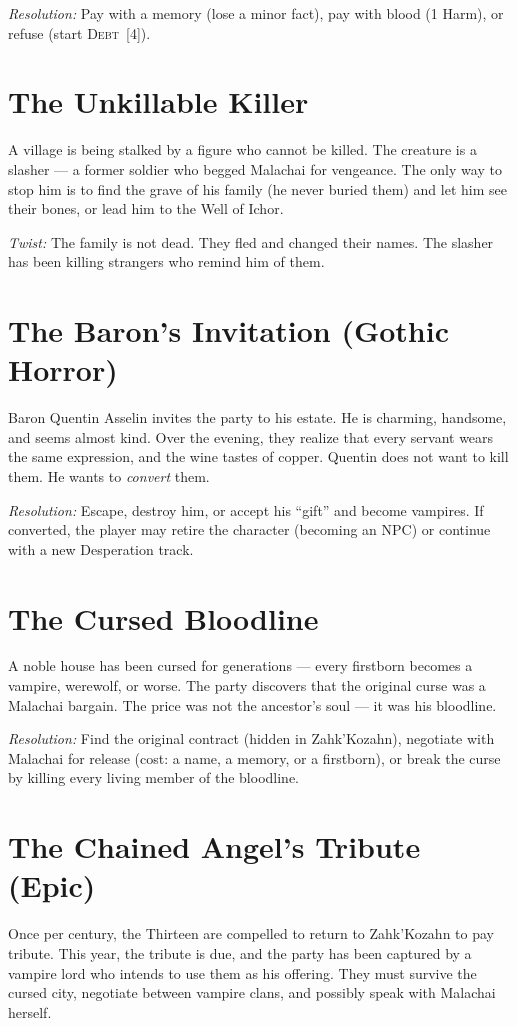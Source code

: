 \documentclass[10pt,twoside]{book}
\newcommand{\timer}[2]{\textsc{#1}~[#2]}
\begin{document}
\textit{Resolution:} Pay with a memory (lose a minor fact), pay with blood (1 Harm), or refuse (start \timer{Debt}{4}).

\section{The Unkillable Killer}
A village is being stalked by a figure who cannot be killed. The creature is a slasher --- a former soldier who begged Malachai for vengeance. The only way to stop him is to find the grave of his family (he never buried them) and let him see their bones, or lead him to the Well of Ichor.

\textit{Twist:} The family is not dead. They fled and changed their names. The slasher has been killing strangers who remind him of them.

\section{The Baron's Invitation (Gothic Horror)}
Baron Quentin Asselin invites the party to his estate. He is charming, handsome, and seems almost kind. Over the evening, they realize that every servant wears the same expression, and the wine tastes of copper. Quentin does not want to kill them. He wants to \textit{convert} them.

\textit{Resolution:} Escape, destroy him, or accept his ``gift'' and become vampires. If converted, the player may retire the character (becoming an NPC) or continue with a new Desperation track.

\section{The Cursed Bloodline}
A noble house has been cursed for generations --- every firstborn becomes a vampire, werewolf, or worse. The party discovers that the original curse was a Malachai bargain. The price was not the ancestor's soul --- it was his bloodline.

\textit{Resolution:} Find the original contract (hidden in Zahk'Kozahn), negotiate with Malachai for release (cost: a name, a memory, or a firstborn), or break the curse by killing every living member of the bloodline.

\section{The Chained Angel's Tribute (Epic)}
Once per century, the Thirteen are compelled to return to Zahk'Kozahn to pay tribute. This year, the tribute is due, and the party has been captured by a vampire lord who intends to use them as his offering. They must survive the cursed city, negotiate between vampire clans, and possibly speak with Malachai herself.
\end{document}
